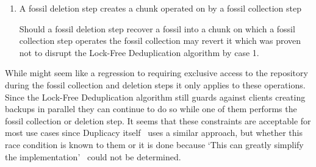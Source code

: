 \begin{enumerate}
    \item A fossil deletion step creates a chunk operated on by a fossil collection step

        Should a fossil deletion step recover a fossil into a chunk on which a
        fossil collection step operates the fossil collection may revert it which
        was proven not to disrupt the Lock-Free Deduplication algorithm by case 1.
\end{enumerate}

While  might seem like a regression to requiring exclusive access to
the repository during the fossil collection and deletion steps it only applies to these operations.
Since the Lock-Free Deduplication algorithm still guards against clients creating backups
in parallel they can continue to do so while one of them performs the fossil collection
or deletion step.
It seems that these constraints are acceptable for most use cases since Duplicacy
itself~\cite[page `prune']{Duplicacy-Wiki} uses a similar approach, but whether this race
condition is known to them or it is done because
`This can greatly simplify the implementation'~\cite[topic `Prune command details']{Duplicacy-Forum}
could not be determined.
